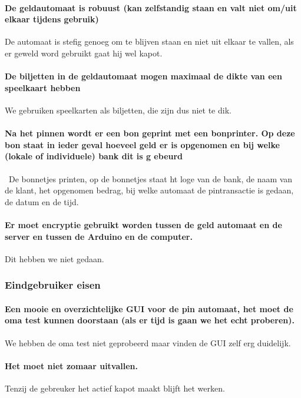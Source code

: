 \documentclass{article}
\begin{document}
\paragraph{De geldautomaat is robuust (kan zelfstandig staan en valt niet om/uit elkaar tijdens gebruik)}
De automaat is stefig genoeg om te blijven staan en niet uit elkaar te vallen, als er geweld word gebruikt gaat hij wel kapot.

\paragraph{De biljetten in de geldautomaat mogen maximaal de dikte van een speelkaart hebben}
We gebruiken speelkarten als biljetten, die zijn dus niet te dik.

\paragraph{Na het pinnen wordt er een bon geprint met een bonprinter. Op deze bon staat in ieder geval hoeveel geld er is opgenomen en bij welke (lokale of individuele) bank dit is g
ebeurd}\
De bonnetjes printen, op de bonnetjes staat ht loge van de bank, de naam van de klant, het opgenomen bedrag, bij welke automaat de pintransactie is gedaan, de datum en de tijd.

\paragraph{Er moet encryptie gebruikt worden tussen de geld automaat en de server en tussen de Arduino en de computer.}
Dit hebben we niet gedaan.

\subsubsection{Eindgebruiker eisen}

\paragraph{Een mooie en overzichtelijke GUI voor de pin automaat, het moet de oma test kunnen doorstaan (als er tijd is gaan we het echt proberen).}
We hebben de oma test niet geprobeerd maar vinden de GUI zelf erg duidelijk.

\paragraph{Het moet niet zomaar uitvallen.}
Tenzij de gebreuker het actief kapot maakt blijft het werken.
\end{document}
